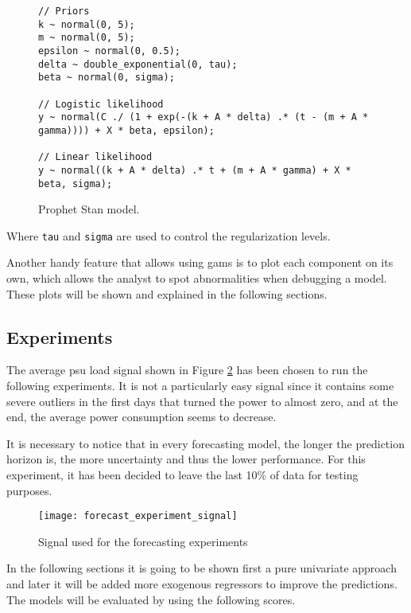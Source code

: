 \begin{figure}[H]
\begin{lstlisting}
// Priors
k ~ normal(0, 5);
m ~ normal(0, 5);
epsilon ~ normal(0, 0.5);
delta ~ double_exponential(0, tau);
beta ~ normal(0, sigma);

// Logistic likelihood
y ~ normal(C ./ (1 + exp(-(k + A * delta) .* (t - (m + A * gamma)))) + X * beta, epsilon);

// Linear likelihood
y ~ normal((k + A * delta) .* t + (m + A * gamma) + X * beta, sigma);
\end{lstlisting}
\caption{Prophet Stan model.}
\label{alg:stan}
\end{figure}

Where \texttt{tau} and \texttt{sigma} are used to control the regularization levels.

Another handy feature that allows using \acp{gam} is to plot each component on its own, which allows the analyst to spot abnormalities when debugging a model. These plots will be shown and explained in the following sections.

\pagebreak
\subsection{Experiments}

The average \ac{psu} load signal shown in Figure \ref{fig:forecast_experiment_signal} has been chosen to run the following experiments. It is not a particularly easy signal since it contains some severe outliers in the first days that turned the power to almost zero, and at the end, the average power consumption seems to decrease.

It is necessary to notice that in every forecasting model, the longer the prediction horizon is, the more uncertainty and thus the lower performance. For this experiment, it has been decided to leave the last 10\% of data for testing purposes.

\begin{figure}[H]
	\centering
	\texttt{[image: forecast\_experiment\_signal]}
	\caption{Signal used for the forecasting experiments}
	\label{fig:forecast_experiment_signal}
\end{figure}

In the following sections it is going to be shown first a pure univariate approach and later it will be added more exogenous regressors to improve the predictions. The models will be evaluated by using the following scores.


